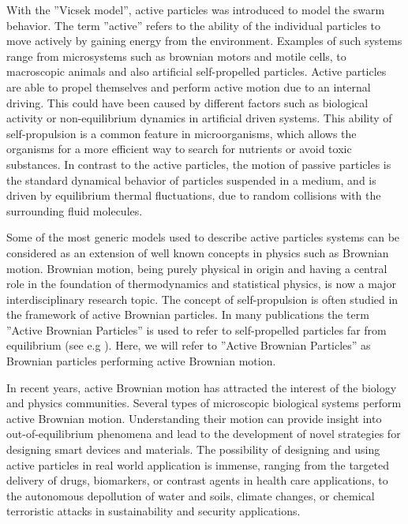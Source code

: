 With the ''Vicsek model'', active particles was introduced to model the 
swarm behavior. The term ''active'' refers to the ability of the individual 
particles to move actively by gaining energy from the 
environment\cite{romanczuk2012active}. Examples of such systems range from 
microsystems such as brownian motors\cite{reimann2002brownian} and 
motile cells\cite{friedrich2007chemotaxis,selmeczi2008cell,boedeker2010quantitative}, 
to macroscopic animals\cite{kareiva1983analyzing,komin2004random} and also 
artificial self-propelled particles\cite{paxton2004catalytic,howse2007self}. 
Active particles are able to propel themselves and perform active motion due 
to an internal driving. This could have been caused by different factors such 
as biological activity or non-equilibrium dynamics in artificial driven 
systems\cite{romanczuk2012active}. This ability of self-propulsion is a 
common feature in microorganisms\cite{lauga2009hydrodynamics, cates2012diffusive, poon2013clarkia}, 
which allows the organisms for a more efficient way to search for nutrients or 
avoid toxic substances\cite{viswanathan2011physics}. In contrast to the active particles, 
the motion of passive particles is the standard dynamical behavior of particles 
suspended in a medium, and is driven by equilibrium thermal fluctuations, due to 
random collisions with the surrounding fluid molecules\cite{babivc2005colloids}. 

Some of the most generic models used to describe active particles systems can be considered 
as an extension of well known concepts in physics such as Brownian motion. Brownian motion, 
being purely physical in origin and having a central role in the foundation of thermodynamics and 
statistical physics, is now a major interdisciplinary research topic. The concept of self-propulsion 
is often studied in the framework of active Brownian particles. In many publications 
the term ''Active Brownian Particles'' is used to refer to self-propelled particles 
far from equilibrium (see e.g \cite{schweitzer1998complex,ebeling1999active,erdmann2003collective,
schweitzer2003brownian,romanczuk2008beyond}). Here, we will refer to ''Active Brownian Particles'' 
as Brownian particles performing active Brownian motion.

In recent years, active Brownian motion has attracted the interest of the biology 
and physics communities\cite{ebbens2010pursuit, poon2013clarkia}. Several types of 
microscopic biological systems perform active Brownian motion. 
Understanding their motion can provide insight into out-of-equilibrium phenomena\cite{volpe2014simulation} 
and lead to the development of novel strategies for designing smart devices and materials\cite{bechinger2016active}. 
The possibility of designing and using active particles in real world application is immense, 
ranging from the targeted delivery of drugs, biomarkers, or contrast agents in 
health care applications\cite{nelson2010microrobots, wang2012nano, patra2013intelligent, abdelmohsen2014micro},
to the autonomous depollution of water and soils, 
climate changes, or chemical terroristic attacks in sustainability and security applications\cite{gao2014environmental}. 

